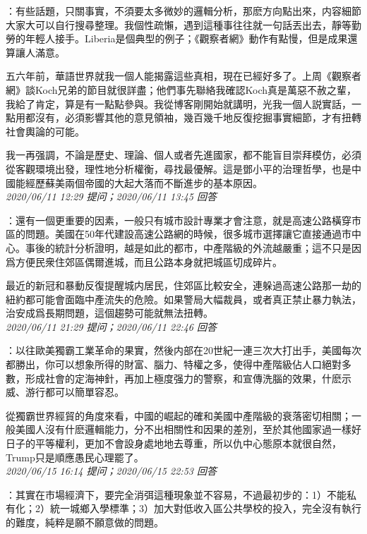 \documentclass[twocolumn]{ctexart}
\begin{document}
：有些話題，只關事實，不須要太多微妙的邏輯分析，那麽方向點出來，内容細節大家大可以自行搜尋整理。我個性疏懶，遇到這種事往往就一句話丟出去，靜等勤勞的年輕人接手。Liberia是個典型的例子；《觀察者網》動作有點慢，但是成果還算讓人滿意。

五六年前，華語世界就我一個人能揭露這些真相，現在已經好多了。上周《觀察者網》談Koch兄弟的節目就很詳盡；他們事先聯絡我確認Koch真是萬惡不赦之輩，我給了肯定，算是有一點點參與。我從博客剛開始就講明，光我一個人説實話，一點用都沒有，必須影響其他的意見領袖，幾百幾千地反復挖掘事實細節，才有扭轉社會輿論的可能。

我一再强調，不論是歷史、理論、個人或者先進國家，都不能盲目崇拜模仿，必須從客觀環境出發，理性地分析權衡，尋找最優解。這是鄧小平的治理哲學，也是中國能經歷蘇美兩個帝國的大起大落而不斷進步的基本原因。
\\

\textit{\hfill\noindent\small 2020/06/11 12:29 提问；2020/06/11 13:45 回答}

：還有一個更重要的因素，一般只有城市設計專業才會注意，就是高速公路橫穿市區的問題。美國在50年代建設高速公路網的時候，很多城市選擇讓它直接通過市中心。事後的統計分析證明，越是如此的都市，中產階級的外流越嚴重；這不只是因爲方便民衆住郊區偶爾進城，而且公路本身就把城區切成碎片。

最近的新冠和暴動反復提醒城内居民，住郊區比較安全，連躲過高速公路那一劫的紐約都可能會面臨中產流失的危險。如果警局大幅裁員，或者真正禁止暴力執法，治安成爲長期問題，這個趨勢可能就無法扭轉。
\\

\textit{\hfill\noindent\small 2020/06/11 21:29 提问；2020/06/11 22:46 回答}

：以往歐美獨霸工業革命的果實，然後内部在20世紀一連三次大打出手，美國每次都勝出，你可以想象所得的財富、腦力、特權之多，使得中產階級佔人口絕對多數，形成社會的定海神針，再加上極度强力的警察，和宣傳洗腦的效果，什麽示威、游行都可以簡單容忍。

從獨霸世界經貿的角度來看，中國的崛起的確和美國中產階級的衰落密切相關；一般美國人沒有什麽邏輯能力，分不出相關性和因果的差別，至於其他國家過一樣好日子的平等權利，更加不會設身處地地去尊重，所以仇中心態原本就很自然，Trump只是順應愚民心理罷了。
\\

\textit{\hfill\noindent\small 2020/06/15 16:14 提问；2020/06/15 22:53 回答}

：其實在市場經濟下，要完全消弭這種現象並不容易，不過最初步的：1）不能私有化；2）統一城鄉入學標準；3）加大對低收入區公共學校的投入，完全沒有執行的難度，純粹是願不願意做的問題。
\\
\end{document}
